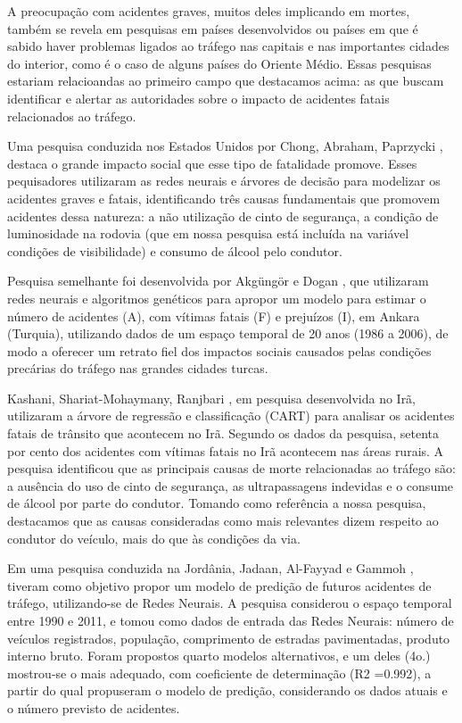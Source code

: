 A preocupação com acidentes graves, muitos deles implicando em mortes, também se revela em pesquisas em países desenvolvidos ou países em que é sabido haver problemas ligados ao tráfego nas capitais e nas importantes cidades do interior, como é o caso de alguns países do Oriente Médio. Essas pesquisas estariam relacioandas ao primeiro campo que destacamos acima: as que buscam identificar e alertar as autoridades sobre o impacto de acidentes fatais relacionados ao tráfego.

Uma pesquisa conduzida nos Estados Unidos por Chong, Abraham, Paprzycki \cite{chong2004traffic}, destaca o grande impacto social que esse tipo de fatalidade promove. Esses pequisadores utilizaram as redes neurais e árvores de decisão para modelizar os acidentes graves e fatais, identificando três causas fundamentais que promovem acidentes dessa natureza: a não utilização de cinto de segurança, a condição de luminosidade na rodovia (que em nossa pesquisa está incluída na variável condições de visibilidade) e consumo de álcool pelo condutor.

Pesquisa semelhante foi desenvolvida por Akgüngör e Dogan \cite{akgungor2009artificial}, que utilizaram redes neurais e algoritmos genéticos para apropor um modelo para estimar o número de acidentes (A), com vítimas fatais (F) e prejuízos (I), em Ankara (Turquia), utilizando dados de um espaço temporal de 20 anos (1986 a 2006), de modo a oferecer um retrato fiel dos impactos sociais causados pelas condições precárias do tráfego nas grandes cidades turcas.

Kashani, Shariat-Mohaymany, Ranjbari \cite{tavakoli2011data}, em pesquisa desenvolvida no Irã, utilizaram a árvore de regressão e classificação (CART) para analisar os acidentes fatais de trânsito que acontecem no Irã. Segundo os dados da pesquisa, setenta por cento dos acidentes com vítimas fatais no Irã acontecem nas áreas rurais. A pesquisa identificou que as principais causas de morte relacionadas ao tráfego são: a ausência do uso de cinto de segurança, as ultrapassagens indevidas e o consume de álcool por parte do condutor. Tomando como referência a nossa pesquisa, destacamos que as causas consideradas como mais relevantes dizem respeito ao condutor do veículo, mais do que às condições da via.

Em uma pesquisa conduzida na Jordânia, Jadaan, Al-Fayyad e Gammoh \cite{jadaan2014prediction}, tiveram como objetivo propor um modelo de predição de futuros acidentes de tráfego, utilizando-se de Redes Neurais. A pesquisa considerou o espaço temporal entre 1990 e 2011, e tomou como dados de entrada das Redes Neurais: número de veículos registrados, população, comprimento de estradas pavimentadas, produto interno bruto. Foram propostos quarto modelos alternativos, e um deles (4o.) mostrou-se o mais adequado, com coeficiente de determinação (R2 =0.992), a partir do qual propuseram o modelo de predição, considerando os dados atuais e o número previsto de acidentes.

